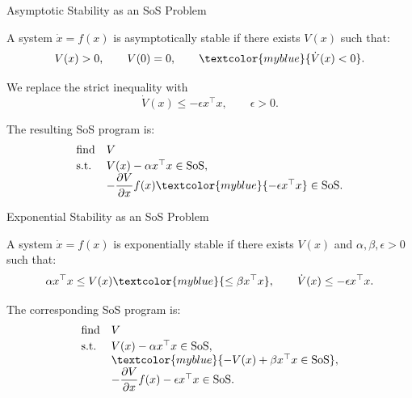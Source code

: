 \documentclass{beamer}
\begin{document}
\begin{frame}{Asymptotic Stability as an SoS Problem}
	\begin{flushleft}
		A system $\dot{x}=f(x)$	is asymptotically stable if there exists $V(x)$ such that:
		\[
		V(x)>0,\qquad V(0)=0,\qquad
		\textcolor{myblue}{\dot V(x)<0}.
		\]
		
		We replace the strict inequality with
		\[
		\dot V(x)\leq-\epsilon x^\top x,
		\qquad \epsilon>0.
		\]
		
		The resulting SoS program is:
		\[
		\begin{array}{ll}
			\text{find} & V\\[0.2em]
			\text{s.t.} &
			V(x)-\alpha x^\top x\in\mathrm{SoS},\\
			&
			-\dfrac{\partial V}{\partial x}f(x)
			\textcolor{myblue}{-\epsilon x^\top x}\in\mathrm{SoS}.
		\end{array}
		\]
	\end{flushleft}
	
\end{frame}


\begin{frame}{Exponential Stability as an SoS Problem}
	\begin{flushleft}
		A system $\dot{x}=f(x)$	is exponentially stable if there exists $V(x)$ and
		$\alpha,\beta,\epsilon>0$ such that:
		\[
		\alpha x^\top x
		\leq V(x)
		\textcolor{myblue}{\leq \beta x^\top x},\qquad 
		\dot V(x)\leq-\epsilon x^\top x.
		\]
		
		\bigskip
		
		The corresponding SoS program is:
		\[
		\begin{array}{ll}
			\text{find} & V\\[0.2em]
			\text{s.t.} &
			V(x)-\alpha x^\top x\in\mathrm{SoS},\\
			&
			\textcolor{myblue}{-V(x)+\beta x^\top x\in\mathrm{SoS}},\\
			&
			-\dfrac{\partial V}{\partial x}f(x)
			-\epsilon x^\top x\in\mathrm{SoS}.
		\end{array}
		\]
	\end{flushleft}
	
\end{frame}
\end{document}
